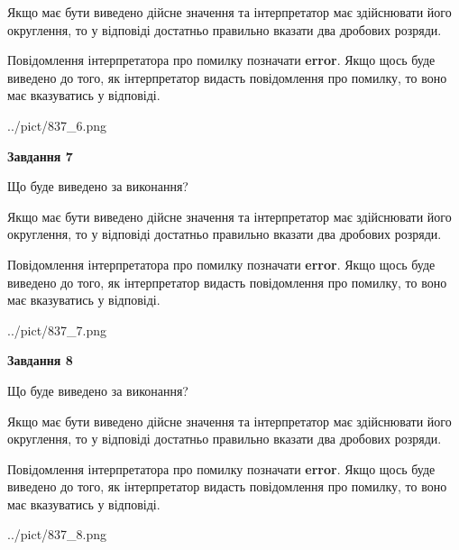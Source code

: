 \documentclass[12pt, ukrainian]{article}
\begin{document}
{\begin {Large}
Якщо має бути виведено дійсне значення та інтерпретатор має здійснювати його округлення, 
то у відповіді достатньо правильно вказати два дробових розряди.

Повідомлення інтерпретатора про помилку позначати \textbf{error}.
Якщо щось буде виведено до того, як інтерпретатор видасть повідомлення про помилку, 
то воно має вказуватись у відповіді. \par

\begin{center}
	{../pict/837_6.png}
\end{center}
\newpage

{\begin {center}\textbf{Завдання 7}\end {center}}\par
Що буде виведено за виконання? \par

Якщо має бути виведено дійсне значення та інтерпретатор має здійснювати його округлення, 
то у відповіді достатньо правильно вказати два дробових розряди.

Повідомлення інтерпретатора про помилку позначати \textbf{error}.
Якщо щось буде виведено до того, як інтерпретатор видасть повідомлення про помилку, 
то воно має вказуватись у відповіді. \par

\begin{center}
	{../pict/837_7.png}
\end{center}
\newpage

{\begin {center}\textbf{Завдання 8}\end {center}}\par
Що буде виведено за виконання? \par

Якщо має бути виведено дійсне значення та інтерпретатор має здійснювати його округлення, 
то у відповіді достатньо правильно вказати два дробових розряди.

Повідомлення інтерпретатора про помилку позначати \textbf{error}.
Якщо щось буде виведено до того, як інтерпретатор видасть повідомлення про помилку, 
то воно має вказуватись у відповіді. \par

\begin{center}
	{../pict/837_8.png}
\end{center}
\newpage


\end{Large}}
\end{document}
